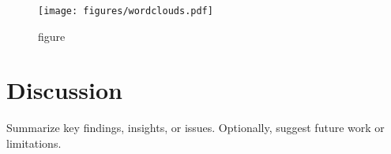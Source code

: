 \documentclass[10pt]{article}
\begin{document}
	\blindtext 
	\begin{figure}
		\texttt{[image: figures/wordclouds.pdf]}
		\caption{figure}
	\end{figure}
	

	
	
	\section{Discussion}
	Summarize key findings, insights, or issues. Optionally, suggest future work or limitations.
	\blindtext
	
\end{document}
